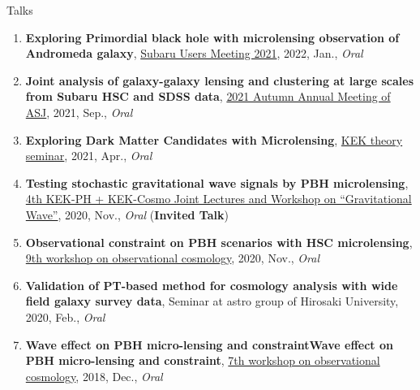 \begin{rSection}{Talks}
\begin{enumerate}
\item \textbf{Exploring Primordial black hole with microlensing observation of Andromeda galaxy}, \href{https://subarutelescope.org/Science/SubaruUM/SubaruUM2021/}{Subaru Users Meeting 2021}, 2022, Jan., \textit{Oral}
\item \textbf{Joint analysis of galaxy-galaxy lensing and clustering at large scales from Subaru HSC and SDSS data}, \href{https://www.asj.or.jp/nenkai/archive/2021b/pdf/U05a.pdf}{2021 Autumn Annual Meeting of ASJ}, 2021, Sep., \textit{Oral}
\item \textbf{Exploring Dark Matter Candidates with Microlensing}, \href{https://www.kek.jp/ja/conference/20210407-3/}{KEK theory seminar}, 2021, Apr., \textit{Oral}
\item \textbf{Testing stochastic gravitational wave signals by PBH microlensing}, \href{http://conference-indico.kek.jp/event/117/timetable/#day-2020-11-04}{4th KEK-PH + KEK-Cosmo Joint Lectures and Workshop on ``Gravitational Wave''}, 2020, Nov., \textit{Oral} (\textbf{Invited Talk})
\item \textbf{Observational constraint on PBH scenarios with HSC microlensing}, \href{https://indico.ipmu.jp/event/382/timetable/#all}{9th workshop on observational cosmology}, 2020, Nov., \textit{Oral}
\item \textbf{Validation of PT-based method for cosmology analysis with wide field galaxy survey data}, Seminar at astro group of Hirosaki University, 2020, Feb., \textit{Oral}
\item \textbf{Wave effect on PBH micro-lensing and constraintWave effect on PBH micro-lensing and constraint}, \href{http://web.cc.yamaguchi-u.ac.jp/~rsaito/obscosmo2018/}{7th workshop on observational cosmology}, 2018, Dec., \textit{Oral}
\end{enumerate}\end{rSection}
